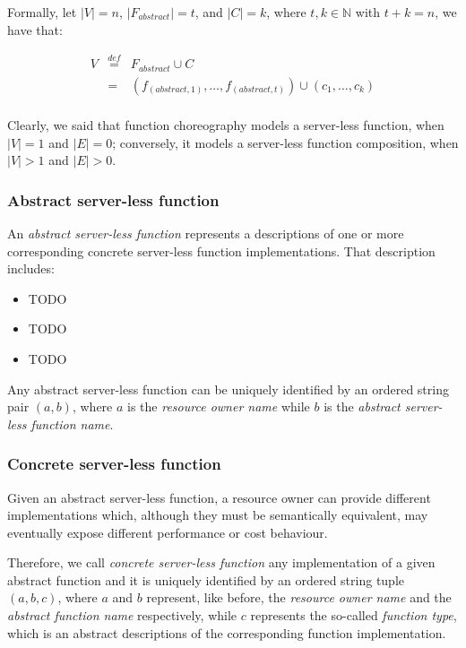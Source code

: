 \documentclass[10pt,a4paper]{article}
\newcommand{\mathDef}{\overset{\textit{def}}{=}}
\theoremstyle{definition}
\begin{document}
Formally, let $|V| = n$, $|F_{abstract}| = t$, and $|C| = k$, where $t,k \in \mathbb{N}$ with $t + k = n$, we have that:

\begin{equation}
\begin{array}{lll}

V & \mathDef & F_{abstract} \cup C \\
  & = & (f_{(abstract, 1)}, \ldots, f_{(abstract, t)}) \cup (c_1, \ldots, c_k) \\
\end{array}
\end{equation}

Clearly, we said that function choreography models a server-less function, when $|V| = 1$ and $|E| = 0$; conversely, it models a server-less function composition, when $|V| > 1$ and $|E| > 0$.

\subsubsection{Abstract server-less function}

An \textit{abstract server-less function} represents a descriptions of one or more corresponding concrete server-less function implementations. That description includes:

\begin{itemize}

\item TODO
\item TODO
\item TODO

\end{itemize}

Any abstract server-less function can be uniquely identified by an ordered string pair $(a, b)$, where $a$ is the \textit{resource owner name} while $b$ is the \textit{abstract server-less function name}.

\subsubsection{Concrete server-less function}

Given an abstract server-less function, a resource owner can provide different implementations which, although they must be semantically equivalent, may eventually expose different performance or cost behaviour.

Therefore, we call \textit{concrete server-less function} any implementation of a given abstract function and it is uniquely identified by an ordered string tuple $(a, b, c)$, where $a$ and $b$ represent, like before, the \textit{resource owner name} and the \textit{abstract function name} respectively, while $c$ represents the so-called \textit{function type}, which is an abstract descriptions of the corresponding function implementation.
\end{document}
